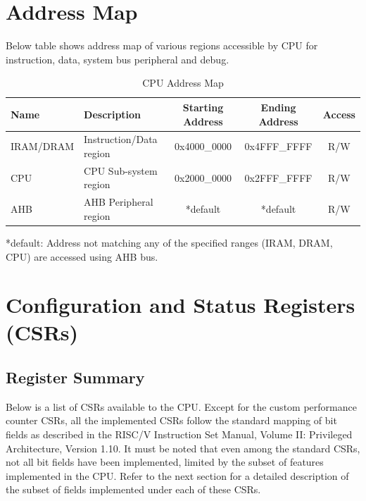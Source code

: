 \documentclass[main\_\_EN.tex]{subfiles}
\begin{document}
\section{Address Map}

Below table shows address map of various regions accessible by CPU for instruction, data, system bus peripheral and debug.

\begin{longtable}{| l| l |c | c | c  |}
\caption{CPU Address Map} \label{tab:riscvcpu-mem-blocks}
\\ \hline
\rowcolor{lightgray}
Name & Description    &  Starting Address  &  Ending Address  & Access   \\ \hline
IRAM/DRAM\label{TBD1} & Instruction/Data region  &   0x4000\_0000  &  0x4FFF\_FFFF  &  R/W  \\ \hline
CPU \label{TBD4} & CPU Sub-system region  &      0x2000\_0000  &  0x2FFF\_FFFF  &  R/W  \\ \hline
AHB\label{TBD3} & AHB Peripheral region &      *default  &  *default  &  R/W  \\ \hline
\end{longtable}

*default: Address not matching any of the specified ranges (IRAM, DRAM, CPU) are accessed using AHB bus.



\section{Configuration and Status Registers (CSRs)}
\hypertarget{riscvcpu-cpu-reg-summ}{}
\subsection{Register Summary}
\label{sec:riscvcpu-cpu-reg-summ}


Below is a list of CSRs available to the CPU. Except for the custom performance counter CSRs, all the implemented CSRs follow the standard mapping of bit fields as described in the RISC\-/V Instruction Set Manual, Volume II: Privileged Architecture, Version 1.10. It must be noted that even among the standard CSRs, not all bit fields have been implemented, limited by the subset of features implemented in the CPU. Refer to the next section for a detailed description of the subset of fields implemented under each of these CSRs.


\end{document}

